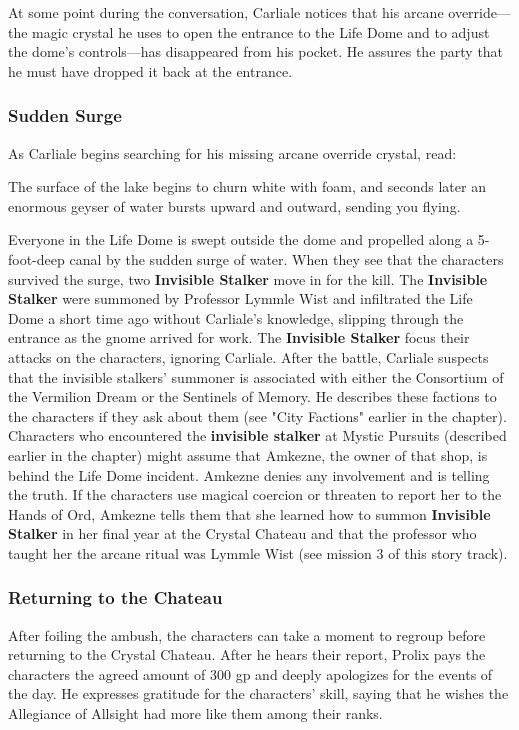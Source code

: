\documentclass[10pt,a4,twoside,twocolumn,openany,nodeprecatedcode]{dndbook}
\begin{document}
At some point during the conversation, Carliale notices that his arcane override—the magic crystal he uses to open the entrance to the Life Dome and to adjust the dome's controls—has disappeared from his pocket. He assures the party that he must have dropped it back at the entrance.
\subsubsection{Sudden Surge}
As Carliale begins searching for his missing arcane override crystal, read:
\begin{DndReadAloud}{}
The surface of the lake begins to churn white with foam, and seconds later an enormous geyser of water bursts upward and outward, sending you flying.
\end{DndReadAloud}

Everyone in the Life Dome is swept outside the dome and propelled along a 5-foot-deep canal by the sudden surge of water.
When they see that the characters survived the surge, two \textbf{Invisible Stalker} move in for the kill. The \textbf{Invisible Stalker} were summoned by Professor Lymmle Wist and infiltrated the Life Dome a short time ago without Carliale's knowledge, slipping through the entrance as the gnome arrived for work. The \textbf{Invisible Stalker} focus their attacks on the characters, ignoring Carliale.
After the battle, Carliale suspects that the invisible stalkers' summoner is associated with either the Consortium of the Vermilion Dream or the Sentinels of Memory. He describes these factions to the characters if they ask about them (see "City Factions" earlier in the chapter).
Characters who encountered the \textbf{invisible stalker} at Mystic Pursuits (described earlier in the chapter) might assume that Amkezne, the owner of that shop, is behind the Life Dome incident. Amkezne denies any involvement and is telling the truth. If the characters use magical coercion or threaten to report her to the Hands of Ord, Amkezne tells them that she learned how to summon \textbf{Invisible Stalker} in her final year at the Crystal Chateau and that the professor who taught her the arcane ritual was Lymmle Wist (see mission 3 of this story track).
\subsubsection{Returning to the Chateau}
After foiling the ambush, the characters can take a moment to regroup before returning to the Crystal Chateau. After he hears their report, Prolix pays the characters the agreed amount of 300 gp and deeply apologizes for the events of the day. He expresses gratitude for the characters' skill, saying that he wishes the Allegiance of Allsight had more like them among their ranks.
\end{document}
